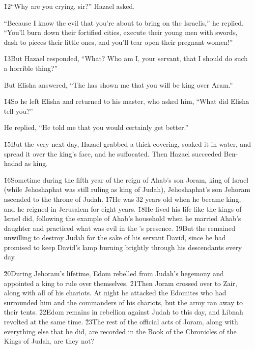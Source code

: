 \v{12}``Why are you crying, sir?'' Hazael asked.

``Because I know the evil that you're about to bring on the Israelis,'' he replied. ``You'll burn down their fortified cities, execute their young men with swords, dash to pieces their little ones, and you'll tear open their pregnant women!''

\v{13}But Hazael responded, ``What? Who am I, your servant, that I should do such a horrible thing?''

But Elisha answered, ``The  has shown me that you will be king over Aram.''

\v{14}So he left Elisha and returned to his master, who asked him, ``What did Elisha tell you?''

He replied, ``He told me that you would certainly get better.''

\v{15}But the very next day, Hazael grabbed a thick covering, soaked it in water, and spread it over the king's face, and he suffocated. Then Hazael succeeded Ben-hadad as king.

\v{16}Sometime during the fifth year of the reign of Ahab's son Joram, king of Israel (while Jehoshaphat was still ruling as king of Judah), Jehoshaphat's son Jehoram ascended to the throne of Judah. \v{17}He was 32 years old when he became king, and he reigned in Jerusalem for eight years. \v{18}He lived his life like the kings of Israel did, following the example of Ahab's household when he married Ahab's daughter and practiced what was evil in the 's presence. \v{19}But the  remained unwilling to destroy Judah for the sake of his servant David, since he had promised to keep David's lamp burning brightly through his descendants every day.

\v{20}During Jehoram's lifetime, Edom rebelled from Judah's hegemony and appointed a king to rule over themselves. \v{21}Then Joram crossed over to Zair, along with all of his chariots. At night he attacked the Edomites who had surrounded him and the commanders of his chariots, but the army ran away to their tents. \v{22}Edom remains in rebellion against Judah to this day, and Libnah revolted at the same time. \v{23}The rest of the official acts of Joram, along with everything else that he did, are recorded in the Book of the Chronicles of the Kings of Judah, are they not?

